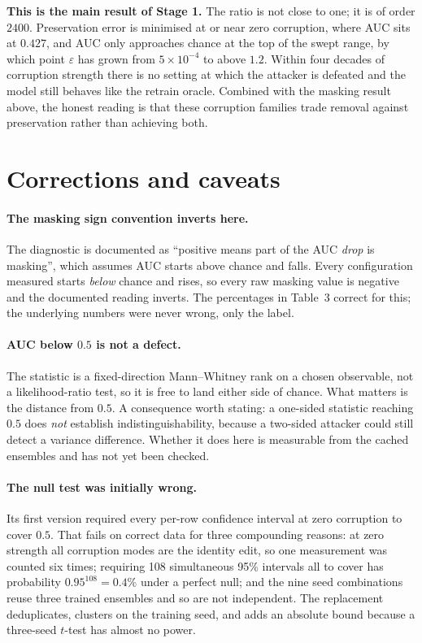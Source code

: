 \documentclass[11pt,a4paper]{article}
\begin{document}
\textbf{This is the main result of Stage 1.} The ratio is not close to one; it is
of order $2400$. Preservation error is minimised at or near zero corruption,
where AUC sits at $0.427$, and AUC only approaches chance at the top of the
swept range, by which point $\varepsilon$ has grown from $5\times10^{-4}$ to
above $1.2$. Within four decades of corruption strength there is no setting at
which the attacker is defeated and the model still behaves like the retrain
oracle. Combined with the masking result above, the honest reading is that these
corruption families trade removal against preservation rather than achieving
both.


\clearpage
\section{Corrections and caveats}

\paragraph{The masking sign convention inverts here.} The diagnostic is
documented as ``positive means part of the AUC \emph{drop} is masking'', which
assumes AUC starts above chance and falls. Every configuration measured starts
\emph{below} chance and rises, so every raw masking value is negative and the
documented reading inverts. The percentages in Table~3 correct for this; the
underlying numbers were never wrong, only the label.

\paragraph{AUC below $0.5$ is not a defect.} The statistic is a fixed-direction
Mann--Whitney rank on a chosen observable, not a likelihood-ratio test, so it is
free to land either side of chance. What matters is the distance from $0.5$.
A consequence worth stating: a one-sided statistic reaching $0.5$ does
\emph{not} establish indistinguishability, because a two-sided attacker could
still detect a variance difference. Whether it does here is measurable from the
cached ensembles and has not yet been checked.

\paragraph{The null test was initially wrong.} Its first version required every
per-row confidence interval at zero corruption to cover $0.5$. That fails on
correct data for three compounding reasons: at zero strength all corruption
modes are the identity edit, so one measurement was counted six times;
requiring 108 simultaneous 95\% intervals all to cover has probability
$0.95^{108}=0.4\%$ under a perfect null; and the nine seed combinations reuse
three trained ensembles and so are not independent. The replacement
deduplicates, clusters on the training seed, and adds an absolute bound because
a three-seed $t$-test has almost no power.
\end{document}
